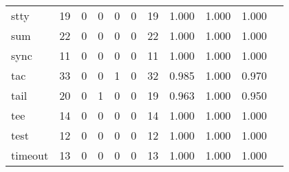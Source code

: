 \begin{longtable}{lp{1.10cm}p{1.10cm}p{1.10cm}p{1.10cm}p{1.10cm}p{1.10cm}p{1.10cm}p{1.10cm}p{1.10cm}p{1.10cm}}
stty      &                     19 &                                  0 &                                 0 &                                0 &                                 0 &                              19 &                          1.000 &                                 1.000 &                               1.000 \\
sum       &                     22 &                                  0 &                                 0 &                                0 &                                 0 &                              22 &                          1.000 &                                 1.000 &                               1.000 \\
sync      &                     11 &                                  0 &                                 0 &                                0 &                                 0 &                              11 &                          1.000 &                                 1.000 &                               1.000 \\
tac       &                     33 &                                  0 &                                 0 &                                1 &                                 0 &                              32 &                          0.985 &                                 1.000 &                               0.970 \\
tail      &                     20 &                                  0 &                                 1 &                                0 &                                 0 &                              19 &                          0.963 &                                 1.000 &                               0.950 \\
tee       &                     14 &                                  0 &                                 0 &                                0 &                                 0 &                              14 &                          1.000 &                                 1.000 &                               1.000 \\
test      &                     12 &                                  0 &                                 0 &                                0 &                                 0 &                              12 &                          1.000 &                                 1.000 &                               1.000 \\
timeout   &                     13 &                                  0 &                                 0 &                                0 &                                 0 &                              13 &                          1.000 &                                 1.000 &                               1.000 \\

\end{longtable}
